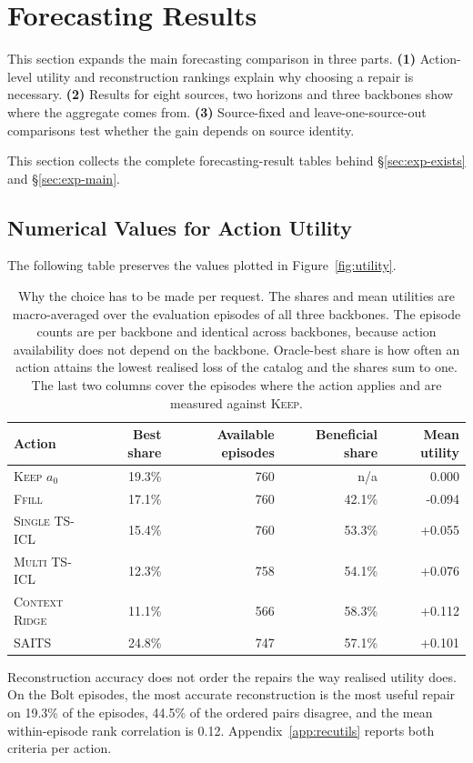 \documentclass{article}
\begin{document}
\section{Forecasting Results}
\label{app:full-results}

This section expands the main forecasting comparison in three parts. \textbf{(1)} Action-level utility and reconstruction rankings explain why choosing a repair is necessary. \textbf{(2)} Results for eight sources, two horizons and three backbones show where the aggregate comes from. \textbf{(3)} Source-fixed and leave-one-source-out comparisons test whether the gain depends on source identity.

This section collects the complete forecasting-result tables behind \S\ref{sec:exp-exists}
and \S\ref{sec:exp-main}.

\subsection{Numerical Values for Action Utility}
\label{app:main-values}
The following table preserves the values plotted in Figure~\ref{fig:utility}.

\begin{table}[!t]
  \caption{Why the choice has to be made per request. The shares and mean utilities are
  macro-averaged over the evaluation episodes of all three backbones. The episode counts are
  per backbone and identical across backbones, because action availability does not depend on
  the backbone. Oracle-best share is how often an action attains the lowest realised loss of the
  catalog and the shares sum to one. The last two columns cover the episodes where the action
  applies and are measured against \textsc{Keep}.}
  \label{tab:heterogeneity}
  \centering
  \small
  \setlength{\tabcolsep}{4pt}
\begin{tabular*}{\textwidth}{@{\extracolsep{\fill}}lrrrr@{}}
    \toprule
    Action & Best share & Available episodes & Beneficial share & Mean utility \\
    \midrule
    \textsc{Keep} $a_0$ & 19.3\% & 760 & n/a & 0.000 \\
    \textsc{Ffill} & 17.1\% & 760 & 42.1\% & -0.094 \\
    \textsc{Single TS-ICL} & 15.4\% & 760 & 53.3\% & +0.055 \\
    \textsc{Multi TS-ICL} & 12.3\% & 758 & 54.1\% & +0.076 \\
    \textsc{Context Ridge} & 11.1\% & 566 & 58.3\% & +0.112 \\
    \textsc{SAITS} & 24.8\% & 747 & 57.1\% & +0.101 \\
    \bottomrule
  \end{tabular*}
  \vspace{-2pt}
  {\footnotesize Reconstruction accuracy does not order the repairs the way realised utility
  does. On the Bolt episodes, the most accurate reconstruction is the most useful repair on
  19.3\% of the
  episodes, 44.5\% of the ordered pairs disagree, and the mean within-episode
  rank correlation is 0.12. Appendix~\ref{app:recutils} reports both criteria per
  action.}
\end{table}
\end{document}
